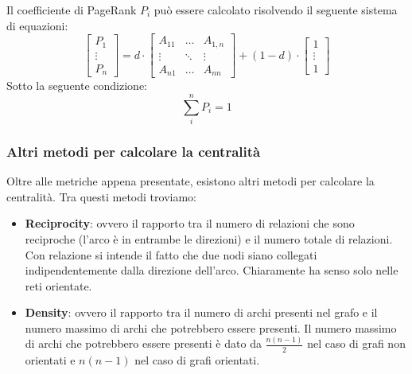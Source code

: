 Il coefficiente di PageRank $P_i$ può essere calcolato risolvendo il seguente
sistema di equazioni:
\begin{equation}
    \left[
        \begin{array}{c}
            P_1    \\
            \vdots \\
            P_n
        \end{array}
        \right] = d \cdot \left[
        \begin{array}{ccc}
            A_{11} & \dots  & A_{1, n} \\
            \vdots & \ddots & \vdots   \\
            A_{n1} & \dots  & A_{nn}
        \end{array}
        \right] + (1 - d) \cdot \left[
        \begin{array}{c}
            1      \\
            \vdots \\
            1
        \end{array} \right]
\end{equation}
Sotto la seguente condizione:
\begin{equation*}
    \sum_{i}^n P_i = 1
\end{equation*}
\subsubsection{Altri metodi per calcolare la centralità}
Oltre alle metriche appena presentate, esistono altri metodi per calcolare la
centralità. Tra questi metodi troviamo:
\begin{itemize}
    \item \textbf{Reciprocity}: ovvero il rapporto tra il numero di relazioni che
          sono reciproche (l'arco è in entrambe le direzioni) e il numero totale
          di relazioni. Con relazione si intende il fatto che due nodi siano
          collegati indipendentemente dalla direzione dell'arco. Chiaramente ha
          senso solo nelle reti orientate.
    \item \textbf{Density}: ovvero il rapporto tra il numero di archi presenti nel
          grafo e il numero massimo di archi che potrebbero essere presenti.
          Il numero massimo di archi che potrebbero essere presenti è dato da
          $\frac{n(n-1)}{2}$ nel caso di grafi non orientati e $n(n-1)$ nel caso
          di grafi orientati.
\end{itemize}
